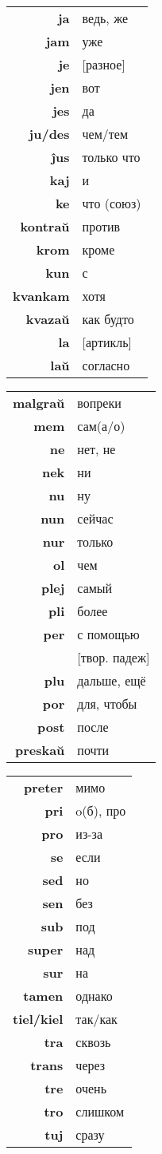 \documentclass{article}
\begin{document}
\begin{tabular}{>{\bfseries}rl}
ja & ведь, же \\
jam & уже \\
je & {}[разное] \\
jen & вот \\
jes & да \\
ju/des & чем/тем \\
ĵus & только что \\
kaj & и \\
ke & что (союз) \\
kontraŭ & против \\
krom & кроме \\
kun & с \\
kvankam & хотя \\
kvazaŭ & как будто \\
la & {}[артикль] \\
laŭ & согласно \\
\end{tabular}
\begin{tabular}{>{\bfseries}rl}
malgraŭ & вопреки \\
mem & сам(а/о) \\
ne & нет, не \\
nek & ни \\
nu & ну \\
nun & сейчас \\
nur & только \\
ol & чем \\
plej & самый \\
pli & более \\
per & с помощью \\
~ & {}[твор. падеж] \\
plu & дальше, ещё \\
por & для, чтобы \\
post & после \\
preskaŭ & почти \\
\end{tabular}
\begin{tabular}{>{\bfseries}rl}
preter & мимо \\
pri & o(б), про \\
pro & из-за \\
se & если \\
sed & но \\
sen & без \\
sub & под \\
super & над \\
sur & на \\
tamen & однако \\
tiel/kiel & так/как \\
tra & сквозь \\
trans & через \\
tre & очень \\
tro & слишком \\
tuj & сразу \\
\end{tabular}
\end{document}
